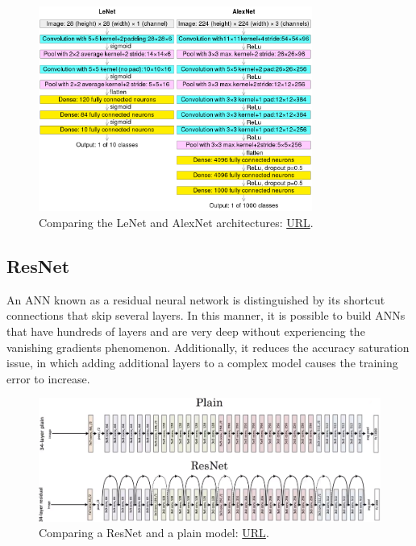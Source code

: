 \begin{figure}[H]
    \centering
        \includegraphics[width=0.8\textwidth]{Images/ANNArchitectures/lenet_vs_alexnet.png}
        \decoRule
        \caption[Comparing LeNet-5 and AlexNet]{Comparing the LeNet and AlexNet architectures: \href{https://en.wikipedia.org/wiki/AlexNet\#/media/File:Comparison_image_neural_networks.svg}{URL}.}
        \label{fig:Lenet_Alexnet_Comparison}
\end{figure}

\subsection{ResNet}
An ANN known as a residual neural network is distinguished by its shortcut connections that skip several layers. In this manner, it is possible to build ANNs that have hundreds of layers and are very deep without experiencing the vanishing gradients phenomenon. Additionally, it reduces the accuracy saturation issue, in which adding additional layers to a complex model causes the training error to increase.
\begin{figure}[H]
    \centering
        \includegraphics[width=1\textwidth]{Images/ANNArchitectures/resnet_vs_plain.png}
        \decoRule
        \caption[Comparing ResNet and plain architectures]{Comparing a ResNet and a plain model: \href{https://towardsdatascience.com/review-resnet-winner-of-ilsvrc-2015-image-classification-localization-detection-e39402bfa5d8}{URL}.}
        \label{fig:ResNet_Plain_Comparison}
\end{figure}

